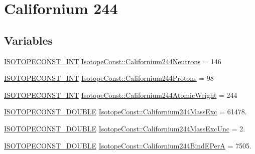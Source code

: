 \hypertarget{group___isotope_const-_californium-_cf244}{}\section{Californium 244}
\label{group___isotope_const-_californium-_cf244}
\subsection*{Variables}
\begin{DoxyCompactItemize}
\item 
\mbox{\hyperlink{group___isotope_const-_macros_ga5f18360b3e99483a35c32d789e62621c}{I\+S\+O\+T\+O\+P\+E\+C\+O\+N\+S\+T\+\_\+\+I\+NT}} \mbox{\hyperlink{group___isotope_const-_californium-_cf244_ga7f323215428734cb8234059316809bfd}{Isotope\+Const\+::\+Californium244\+Neutrons}} = 146
\item 
\mbox{\hyperlink{group___isotope_const-_macros_ga5f18360b3e99483a35c32d789e62621c}{I\+S\+O\+T\+O\+P\+E\+C\+O\+N\+S\+T\+\_\+\+I\+NT}} \mbox{\hyperlink{group___isotope_const-_californium-_cf244_ga550f68a2d1bef37041c28ba6d9882396}{Isotope\+Const\+::\+Californium244\+Protons}} = 98
\item 
\mbox{\hyperlink{group___isotope_const-_macros_ga5f18360b3e99483a35c32d789e62621c}{I\+S\+O\+T\+O\+P\+E\+C\+O\+N\+S\+T\+\_\+\+I\+NT}} \mbox{\hyperlink{group___isotope_const-_californium-_cf244_gab25382b1d9237f058d010fc0b172b3a9}{Isotope\+Const\+::\+Californium244\+Atomic\+Weight}} = 244
\item 
\mbox{\hyperlink{group___isotope_const-_macros_ga8f45a7272ce02c0b4c65c44636ed719a}{I\+S\+O\+T\+O\+P\+E\+C\+O\+N\+S\+T\+\_\+\+D\+O\+U\+B\+LE}} \mbox{\hyperlink{group___isotope_const-_californium-_cf244_ga6c19a0148dcbeba51f1e45253f70b037}{Isotope\+Const\+::\+Californium244\+Mass\+Exc}} = 61478.
\item 
\mbox{\hyperlink{group___isotope_const-_macros_ga8f45a7272ce02c0b4c65c44636ed719a}{I\+S\+O\+T\+O\+P\+E\+C\+O\+N\+S\+T\+\_\+\+D\+O\+U\+B\+LE}} \mbox{\hyperlink{group___isotope_const-_californium-_cf244_gafc7accbb69523ac5da7258437b3fcd69}{Isotope\+Const\+::\+Californium244\+Mass\+Exc\+Unc}} = 2.
\item 
\mbox{\hyperlink{group___isotope_const-_macros_ga8f45a7272ce02c0b4c65c44636ed719a}{I\+S\+O\+T\+O\+P\+E\+C\+O\+N\+S\+T\+\_\+\+D\+O\+U\+B\+LE}} \mbox{\hyperlink{group___isotope_const-_californium-_cf244_ga66211d52df100f27a3b30c3f9ab6e3cc}{Isotope\+Const\+::\+Californium244\+Bind\+E\+PerA}} = 7505.

\end{DoxyCompactItemize}
